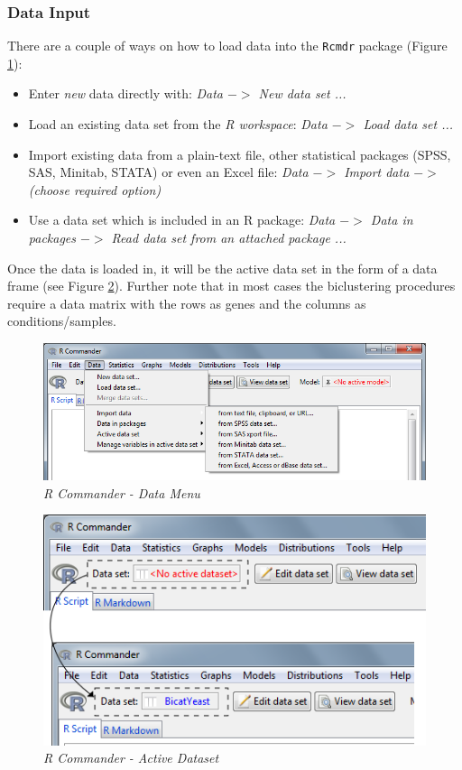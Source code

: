 \documentclass[a4paper]{article}\usepackage[]{graphicx}\usepackage[]{color}
\begin{document}
\subsubsection{Data Input}
There are a couple of ways on how to load data into the \verb|Rcmdr| package
(Figure \ref{datainput}):
\begin{itemize}
  \item Enter {\it new} data directly with: {\it Data $->$ New data set ...}
  \item Load an existing data set from the {\it R workspace}: {\it Data $->$ Load data set ...}
  \item Import existing data from a plain-text file, other statistical packages
  (SPSS, SAS, Minitab, STATA) or even an Excel file: {\it Data $->$ Import data $->$ (choose required option)}
  \item Use a data set which is included in an R package: {\it Data $->$ Data in
  packages $->$ Read data set from an attached package ...}
\end{itemize}
\noindent Once the data is loaded in, it will be the active data set in the form
of a data frame (see Figure \ref{activedataset}). Further note that in most
cases the biclustering procedures require a data matrix with the rows as genes and the columns as conditions/samples.
\begin{figure}[H]
\centering
\includegraphics[scale=0.5]{figures/rcmdr_datainput.png}
\caption{{\it R Commander - Data Menu}\label{datainput}}
\end{figure}
\begin{figure}[H]
\centering
\includegraphics[scale=0.5]{figures/rcmdr_activedataset.png}
\caption{{\it R Commander - Active Dataset}\label{activedataset}}
\end{figure}
\end{document}
